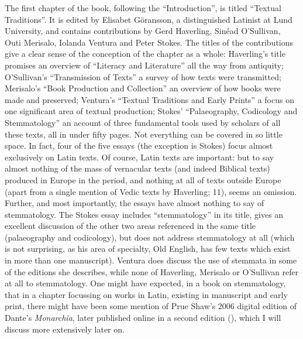 \begin{review}
The first chapter of the book, following the ``Introduction'',
is titled ``Textual Traditions''. It is edited by Elisabet Göransson, a
distinguished Latinist at Lund University, and contains contributions by
Gerd Haverling, Sinéad O'Sullivan, Outi Merisalo, Iolanda Ventura and
Peter Stokes. The titles of the contributions give a clear sense of the
conception of the chapter as a whole: Haverling's title promises an
overview of ``Literacy and Literature'' all the way from antiquity;
O'Sullivan's ``Transmission of Texts'' a survey of how texts were
transmitted; Merisalo's ``Book Production and Collection'' an overview
of how books were made and preserved; Ventura's ``Textual Traditions and
Early Prints'' a focus on one significant area of textual production;
Stokes' ``Palaeography, Codicology and Stemmatology'' an account of
three fundamental tools used by scholars of all these texts, all in
under fifty pages. Not everything can be covered in so little space. In
fact, four of the five essays (the exception is Stokes) focus almost
exclusively on Latin texts. Of course, Latin texts are important: but to
say almost nothing of the mass of vernacular texts (and indeed Biblical
texts) produced in Europe in the period, and nothing at all of texts
outside Europe (apart from a single mention of Vedic texts by Haverling;
11), seems an omission. Further, and most importantly, the essays have
almost nothing to say of stemmatology. The Stokes essay includes
``stemmatology'' in its title, gives an excellent discussion of the
other two areas referenced in the same title (palaeography and
codicology), but does not address stemmatology at all (which is not
surprising, as his area of specialty, Old English, has few texts which
exist in more than one manuscript). Ventura does discuss the use of
stemmata in some of the editions she describes, while none of Haverling,
Merisalo or O'Sullivan refer at all to stemmatology. One might have
expected, in a book on stemmatology, that in a chapter focussing on
works in Latin, existing in manuscript and early print, there might have
been some mention of Prue Shaw's 2006 digital edition of Dante's
\emph{Monarchia}, later published online in a second edition (\citeyear{alighieri_monarchia_2019}),
which I will discuss more extensively later on.


\end{review}
